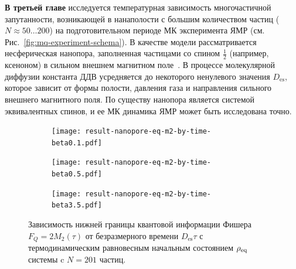\textbf{В третьей главе} исследуется температурная зависимость многочастичной запутанности,
возникающей в нанаполости с большим количеством частиц (\(N\approx50\dots200\)) на подготовительном периоде МК эксперимента ЯМР (см. Рис.~\ref{fig:mq-experiment-schema}).
В качестве модели рассматривается несферическая нанопора, заполненная частицами со спином $\frac 1 2$ (например, ксеноном) в сильном внешнем магнитном поле~\cite{Baugh2001}.
В процессе молекулярной диффузии константа ДДВ усредняется до некоторого ненулевого значения $D_\mathrm{es}$,
которое зависит от формы полости, давления газа и направления сильного внешнего магнитного поля.
По существу нанопора является системой эквивалентных спинов,
и ее МК динамика ЯМР может быть исследована точно.


\begin{figure}[h]
  \centering
  \begin{subfigure}[t]{0.31\textwidth}
    \centering
    \texttt{[image: result-nanopore-eq-m2-by-time-beta0.1.pdf]}
    \caption{\protect}
    \label{fig:result-nanopore-eq-m2-by-time-beta0.1}
  \end{subfigure}
  \hfill
  \begin{subfigure}[t]{0.32\textwidth}
    \centering
    \texttt{[image: result-nanopore-eq-m2-by-time-beta0.5.pdf]}
    \caption{\protect}
    \label{fig:result-nanopore-eq-m2-by-time-beta0.5}
  \end{subfigure}
  \hfill
  \begin{subfigure}[t]{0.34\textwidth}
    \centering
    \texttt{[image: result-nanopore-eq-m2-by-time-beta3.5.pdf]}
    \caption{\protect}
    \label{fig:result-nanopore-eq-m2-by-time-beta3.5}
  \end{subfigure}
  \caption{
    Зависимость нижней границы квантовой информации Фишера $F_Q = 2M_2(\tau)$ от безразмерного времени $D_\mathrm{es}\tau$ с термодинамическим равновесным начальным состоянием $\rho_\mathrm{eq}$ системы c $N=201$ частиц.
  }
  \label{fig:result-nanopore-eq-m2-by-time-betas}
\end{figure}

